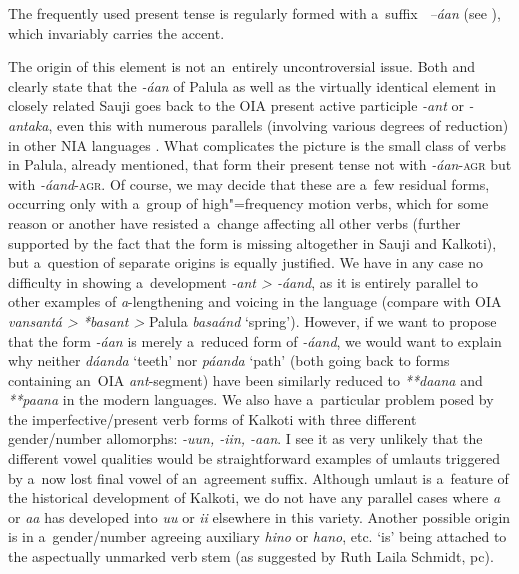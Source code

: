  The frequently used present tense is regularly formed with a~suffix
\textit{~--áan} (see ), which invariably carries the accent.


\largerpage[-1]
The origin of this element is not an~entirely uncontroversial issue. Both \citet[22]{morgenstierne1941} and \citet[48]{buddruss1967} clearly state that the \textit{-áan} of Palula as well as the virtually identical element in closely related Sauji goes back to the OIA present active participle \textit{-ant} or \textit{-antaka}, even this with numerous parallels (involving various degrees of reduction) in other NIA languages \citep[270--271]{masica1991}. What complicates the picture is the small class of verbs in Palula, already mentioned, that form their present tense not with \textit{-áan}-\textsc{agr} but with \textit{-áand}-\textsc{agr}. Of course, we may decide that these are a~few residual forms, occurring only with a~group of high"=frequency motion verbs, which for some reason or another have resisted a~change affecting all other verbs (further supported by the fact that the form is missing altogether in Sauji and Kalkoti), but a~question of separate origins is equally justified. We have in any case no difficulty in showing a~development \textit{-ant {\textgreater} -áand}, as it is entirely parallel to other examples of \textit{a}-lengthening and voicing in the language (compare with OIA \textit{vansantá {\textgreater} *basant {\textgreater}} Palula \textit{basaánd} `spring'). However, if we want to propose that the form \textit{-áan} is merely a~reduced form of \textit{-áand}, we would want to explain why neither \textit{dáanda} `teeth' nor \textit{páanda} `path' (both going back to forms containing an~OIA \textit{ant}-segment) have been similarly reduced to \textit{**daana} and \textit{**paana} in the modern languages. We also have a~particular problem posed by the imperfective/present verb forms of Kalkoti with three different gender/number allomorphs: \textit{-uun, -iin, -aan}. I see it as very unlikely that the different vowel qualities would be straightforward examples of umlauts triggered by a~now lost final vowel of an~agreement suffix. Although umlaut is a~feature of the historical development of Kalkoti, we do not have any parallel cases where \textit{‌a‌} or \textit{‌aa‌} has developed into \textit{‌uu‌} or \textit{‌ii‌} elsewhere in this variety. Another possible origin is in a~gender/number agreeing auxiliary \textit{hino} or \textit{hano}, etc. `is' being attached to the aspectually unmarked verb stem (as suggested by Ruth Laila Schmidt, pc). 



